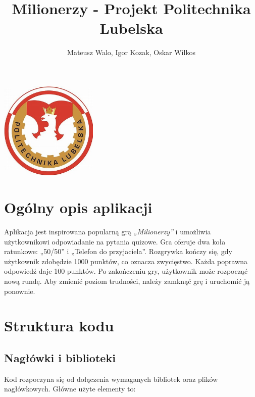 \documentclass[]{article}
\title{Milionerzy - Projekt Politechnika Lubelska}
\author{Mateusz Walo, Igor Kozak, Oskar Wilkos}
\date{}
\begin{document}
	
	\maketitle
	
	\begin{center}
		\includegraphics[width=0.35\textwidth]{pl.jpg} 
	\end{center}
	
	\tableofcontents
	\newpage
	
	\fancyhf{} %
	\pagestyle{fancy}
	\renewcommand{\cftsecfont}{\bfseries} %
	\setlength{\cftsecnumwidth}{2.5em} %
	
	\section{Ogólny opis aplikacji}
	Aplikacja jest inspirowana popularną grą \emph{„Milionerzy”} i umożliwia użytkownikowi odpowiadanie na pytania quizowe. Gra oferuje dwa koła ratunkowe: „50/50” i „Telefon do przyjaciela”. Rozgrywka kończy się, gdy użytkownik zdobędzie 1000 punktów, co oznacza zwycięstwo. Każda poprawna odpowiedź daje 100 punktów. Po zakończeniu gry, użytkownik może rozpocząć nową rundę. Aby zmienić poziom trudności, należy zamknąć grę i uruchomić ją ponownie.
	
	\newpage
	
	\section{Struktura kodu}
	
	\subsection{Nagłówki i biblioteki}
	
	Kod rozpoczyna się od dołączenia wymaganych bibliotek oraz plików nagłówkowych. Główne użyte elementy to:
	
\end{document}
